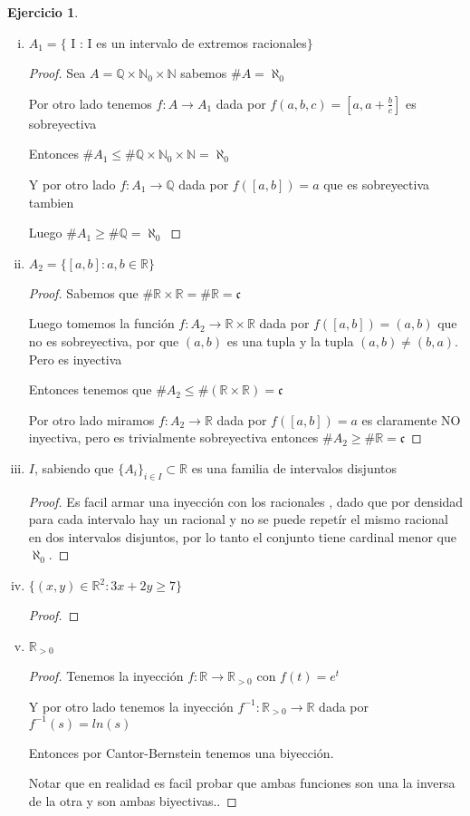 \documentclass[12pt]{article}
\newcommand{\n}{\aleph_{0}}
\newcommand{\Q}{\mathbb{Q}}
\newcommand{\R}{\mathbb{R}}
\newcommand{\N}{\mathbb{N}}
\newcommand{\ra}{\rightarrow}
\theoremstyle{definition}
\newtheorem{ej}{Ejercicio}
\begin{document}
\newpage
\noindent
\begin{ej}
\begin{enumerate}[i.]
  \item $A_{1} = \{$ I : I es un intervalo de extremos racionales$ \}$
    \begin{proof}
      Sea $A = \Q \times \N_{0} \times \N $ sabemos $\# A = \n$ 

      Por otro lado tenemos $f: A \ra A_{1}$ dada por $f(a,b,c) =[a,a+ \frac{b}{c} ] $ es sobreyectiva

      Entonces $\# A_{1} \leq \# \Q \times \N_{0} \times \N = \n$

      Y por otro lado $f: A_{1} \ra \Q$ dada por $f([a,b]) = a$ que es sobreyectiva tambien 

      Luego $\# A_{1} \geq \# \Q = \n$
    \end{proof}
  \item $A_{2} = \{[a,b] : a,b \in \R \}$
    \begin{proof}
      Sabemos que $\# \R \times \R = \# \R = \mathfrak c$

      Luego tomemos la función $f : A_{2} \ra \R \times \R $ dada por $f([a,b]) =(a,b) $ que no es sobreyectiva, por que $(a,b)$ es una tupla y la tupla $(a,b)\neq (b,a)$. Pero es inyectiva

      Entonces tenemos que $\# A_{2} \leq \#( \R \times \R) = \mathfrak{c}$

      Por otro lado miramos $f : A_{2} \ra \R$ dada por $f([a,b]) = a$ es claramente NO inyectiva, pero es trivialmente sobreyectiva entonces $\# A_{2} \geq \# \R = \mathfrak{c}$
    \end{proof}
  \item $I$, sabiendo que $\{A_{i}\}_{i \in I} \subset \R$ es una familia de intervalos disjuntos
    \begin{proof}

	    Es facil armar una inyección con los racionales , dado que por densidad para cada intervalo hay un racional y no se puede repetír el mismo racional en dos intervalos disjuntos, por lo tanto el conjunto tiene cardinal menor que $\n$. 
    \end{proof}
  \item $\{(x,y) \in \R^{2} : 3x + 2y \geq 7\}$
    \begin{proof}
      
    \end{proof}
  \item $\R_{>0}$
    \begin{proof}
      Tenemos la inyección $f : \R \ra \R_{>0}$ con $f(t) = e^t$ 

      Y por otro lado tenemos la inyección $f^{-1} : \R_{>0} \ra \R$ dada por $f^{-1}(s) = ln(s)$

      Entonces por Cantor-Bernstein tenemos una biyección.

      Notar que en realidad es facil probar que ambas funciones son una la inversa de la otra y son ambas biyectivas..
    \end{proof}
\end{enumerate}
\end{ej}
\end{document}
